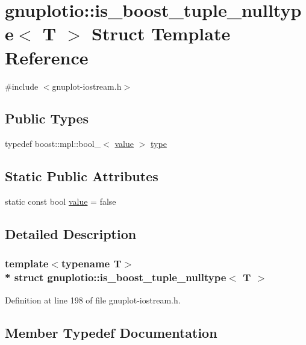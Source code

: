 \hypertarget{structgnuplotio_1_1is__boost__tuple__nulltype}{}\section{gnuplotio\+:\+:is\+\_\+boost\+\_\+tuple\+\_\+nulltype$<$ T $>$ Struct Template Reference}
\label{structgnuplotio_1_1is__boost__tuple__nulltype}


{\ttfamily \#include $<$gnuplot-\/iostream.\+h$>$}

\subsection*{Public Types}
\begin{DoxyCompactItemize}
\item 
typedef boost\+::mpl\+::bool\+\_\+$<$ \hyperlink{structgnuplotio_1_1is__boost__tuple__nulltype_aed42a98e58eb94c7ba55ea7d2a8f7fd2}{value} $>$ \hyperlink{structgnuplotio_1_1is__boost__tuple__nulltype_a6b9e2eaadcaa5c788131d4e9e4186349}{type}
\end{DoxyCompactItemize}
\subsection*{Static Public Attributes}
\begin{DoxyCompactItemize}
\item 
static const bool \hyperlink{structgnuplotio_1_1is__boost__tuple__nulltype_aed42a98e58eb94c7ba55ea7d2a8f7fd2}{value} = false
\end{DoxyCompactItemize}


\subsection{Detailed Description}
\subsubsection*{template$<$typename T$>$\\*
struct gnuplotio\+::is\+\_\+boost\+\_\+tuple\+\_\+nulltype$<$ T $>$}



Definition at line 198 of file gnuplot-\/iostream.\+h.



\subsection{Member Typedef Documentation}
